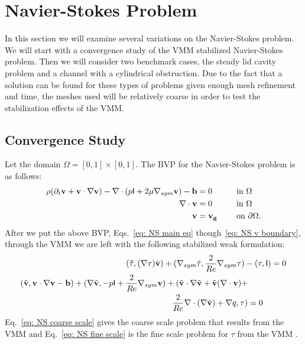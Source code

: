 \section{Navier-Stokes Problem}
In this section we will examine several variations on the Navier-Stokes problem. We will start with a convergence study of the \ac{VMM} stabilized Navier-Stokes problem. Then we will consider two benchmark cases, the steady lid cavity problem and a channel with a cylindrical obstruction. Due to the fact that a solution can be found for these types of problems given enough mesh refinement and time, the meshes used will be relatively coarse in order to test the stabilization effects of the \ac{VMM}.
\subsection{Convergence Study}
Let the domain $\Omega=[0,1]\times[0,1]$. The BVP for the Navier-Stokes problem is as follows:
\begin{alignat}{2}
    \label{eq: NS main eq}
    \rho(\partial_t \boldsymbol{\mathbf{v}} + \boldsymbol{\mathbf{v}}\cdot\nabla\boldsymbol{\mathbf{v}})-\nabla\cdot(p\mathsf{I}+2\mu\nabla_{sym} \boldsymbol{\mathbf{v}})-\boldsymbol{\mathbf{b}} &= 0 \quad & &\text{ in $\Omega$}
    \\
    \label{eq: NS divv ex}
    \nabla\cdot \boldsymbol{\mathbf{v}} &= 0 \quad & &\text{ in $\Omega$}
    \\
    \label{eq: NS v boundary}
    \boldsymbol{\mathbf{v}} &= \boldsymbol{\mathbf{v_g}} \quad & &\text{ on $\partial\Omega$}.
\end{alignat}
After we put the above BVP, Eqs.~\eqref{eq: NS main eq} though~\eqref{eq: NS v boundary}, through the \ac{VMM} we are left with the following stabilized weak formulation:
\begin{align}
    \label{eq: NS fine scale}
    (\mathsf{\tilde{\tau}},(\nabla\mathsf{\tau})\bar{\boldsymbol{\mathbf{v}}}) + (\nabla_{sym} \tilde{\mathsf{\tau}},\frac{2}{Re}\nabla_{sym} \mathsf{\tau})-(\mathsf{\tau},\mathsf{I}) &= 0
    \\
    \label{eq: NS coarse scale}
    \begin{split}
        (\tilde{\boldsymbol{\mathbf{v}}},\boldsymbol{\mathbf{v}}\cdot\nabla\boldsymbol{\mathbf{v}}-\boldsymbol{\mathbf{b}}) + (\nabla\tilde{\boldsymbol{\mathbf{v}}},-p\mathsf{I}+\frac{2}{Re}\nabla_{sym}\boldsymbol{\mathbf{v}}) +  (\tilde{\boldsymbol{\mathbf{v}}}\cdot\nabla\tilde{\boldsymbol{\mathbf{v}}}+\tilde{\boldsymbol{\mathbf{v}}}(\nabla\cdot\boldsymbol{\mathbf{v}})+\\\frac{2}{Re}\nabla\cdot(\nabla\tilde{\boldsymbol{\mathbf{v}}}) + \nabla q,\mathsf{\tau}) &= 0
    \end{split}
\end{align}
Eq.~\eqref{eq: NS coarse scale} gives the coarse scale problem that results from the \ac{VMM} and Eq.~\eqref{eq: NS fine scale} is the fine scale problem for $\tau$ from the \ac{VMM} \cite{masud2006multiscale}.
